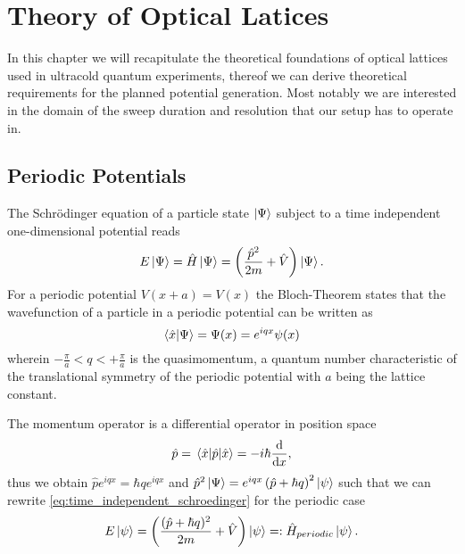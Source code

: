 \chapter{Theory of Optical Latices}

In this chapter we will recapitulate the theoretical foundations of optical
lattices used in ultracold quantum experiments, thereof we can derive
theoretical requirements for the planned potential generation. Most notably
we are interested in the domain of the sweep duration and resolution that
our setup has to operate in.

\section{Periodic Potentials}

The Schrödinger equation of a particle state $\ket{\Psi}$ subject to a time
independent one-dimensional potential reads
\begin{align}
  E\ket{\Psi}
  =\hat{H}\ket{\Psi}
  =\left(\frac{\hat{p}^2}{2m}+\hat{V}\right)\ket{\Psi}
  \label{eq:time_independent_schroedinger}.
\end{align}
For a periodic potential $V(x+a)=V(x)$ the Bloch-Theorem \cite{Ashcroft1976}
states that the wavefunction of a particle in a periodic potential can be
written as
\begin{equation}
  \braket{\hat{x}}{\Psi}
  =\Psi(x)
  =e^{iqx}\psi(x)
  \label{eq:bloch_theorem}
\end{equation}
wherein $-\frac{\pi}{a}<q<+\frac{\pi}{a}$ is the quasimomentum, a quantum
number characteristic of the translational symmetry of the periodic potential
\cite[p. 42]{Lewenstein2012} with $a$ being the lattice constant.

The momentum operator is a differential operator in position space
\begin{equation}
  \hat{p}
  =\expval{\hat{p}}{\hat{x}}
  =-i\hbar\dv{x}
  \label{eq:momentum_operator_in_position_space},
\end{equation}
thus we obtain $\hat{p}e^{iqx}=\hbar qe^{iqx}$ and
$\hat{p}^2\ket{\Psi}=e^{iqx}\left(\hat{p}+\hbar q\right)^2\ket{\psi}$ such
that we can rewrite \cref{eq:time_independent_schroedinger} for
the periodic case
\begin{equation}
  E\ket{\psi}
  =\left(\frac{(\hat{p}+\hbar q)^2}{2m}+\hat{V}\right)\ket{\psi}
  =:\hat{H}_{periodic}\ket{\psi}
  \label{eq:periodic_schroedinger}.
\end{equation}

